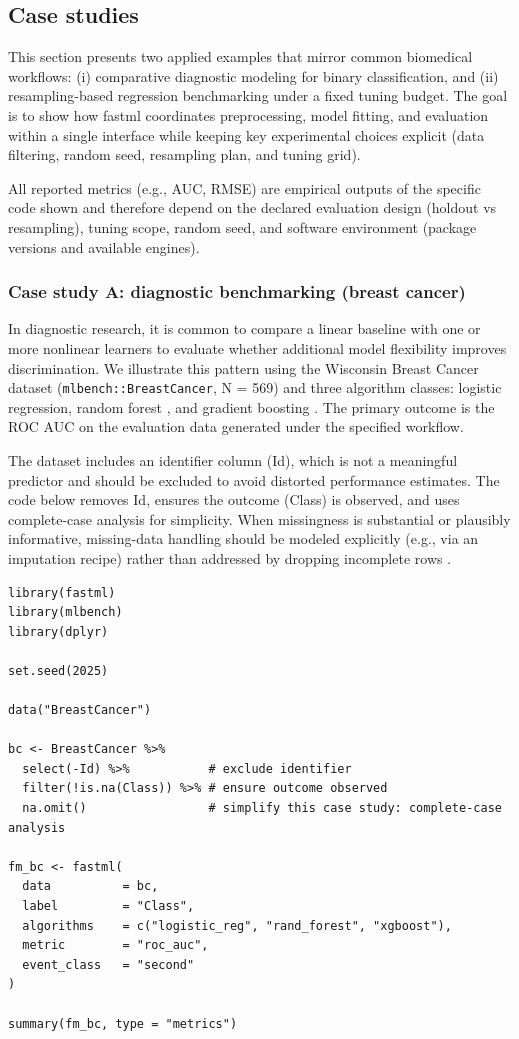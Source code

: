 \subsection{Case studies}\label{case-studies}

This section presents two applied examples that mirror common biomedical workflows: (i) comparative diagnostic modeling for binary classification, and (ii) resampling-based regression benchmarking under a fixed tuning budget. The goal is to show how fastml coordinates preprocessing, model fitting, and evaluation within a single interface while keeping key experimental choices explicit (data filtering, random seed, resampling plan, and tuning grid).

All reported metrics (e.g., AUC, RMSE) are empirical outputs of the specific code shown and therefore depend on the declared evaluation design (holdout vs resampling), tuning scope, random seed, and software environment (package versions and available engines).

\subsubsection{Case study A: diagnostic benchmarking (breast cancer)}\label{case-study-a-diagnostic-benchmarking-breast-cancer}

In diagnostic research, it is common to compare a linear baseline with one or more nonlinear learners to evaluate whether additional model flexibility improves discrimination. We illustrate this pattern using the Wisconsin Breast Cancer dataset (\texttt{mlbench::BreastCancer}, N = 569) \citep{Street:1993aa} and three algorithm classes: logistic regression, random forest \citep{Breiman:2001aa}, and gradient boosting \citep{Chen:2016aa_xgboost}. The primary outcome is the ROC AUC on the evaluation data generated under the specified workflow.

The dataset includes an identifier column (Id), which is not a meaningful predictor and should be excluded to avoid distorted performance estimates. The code below removes Id, ensures the outcome (Class) is observed, and uses complete-case analysis for simplicity. When missingness is substantial or plausibly informative, missing-data handling should be modeled explicitly (e.g., via an imputation recipe) rather than addressed by dropping incomplete rows \citep{Little:2019aa}.

\begin{verbatim}
library(fastml)
library(mlbench)
library(dplyr)

set.seed(2025)

data("BreastCancer")

bc <- BreastCancer %>%
  select(-Id) %>%           # exclude identifier
  filter(!is.na(Class)) %>% # ensure outcome observed
  na.omit()                 # simplify this case study: complete-case analysis

fm_bc <- fastml(
  data          = bc,
  label         = "Class",
  algorithms    = c("logistic_reg", "rand_forest", "xgboost"),
  metric        = "roc_auc",
  event_class   = "second"
)

summary(fm_bc, type = "metrics")
\end{verbatim}

